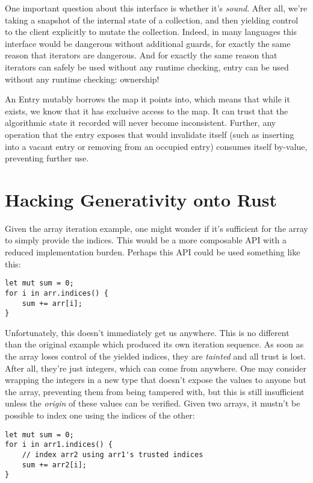 One important question about this interface is whether it's \emph{sound}. After all,
we're taking a snapshot of the internal state of a collection, and then yielding
control to the client explicitly to mutate the collection. Indeed, in many languages
this interface would be dangerous without additional guards, for exactly the same
reason that iterators are dangerous. And for exactly the same reason that iterators
can safely be used without any runtime checking, entry can be used without any
runtime checking: ownership!

An Entry mutably borrows the map it points into, which means that while it
exists, we know that it has exclusive access to the map. It can trust that the
algorithmic state it recorded will never become inconsistent. Further, any operation
that the entry exposes that would invalidate itself (such as inserting into
a vacant entry or removing from an occupied entry) consumes itself by-value,
preventing further use.





\section{Hacking Generativity onto Rust}

Given the array iteration example, one might wonder if it's sufficient for the
array to simply provide the indices. This would be a more composable API with
a reduced implementation burden. Perhaps this API could be used something like this:

\begin{verbatim}
let mut sum = 0;
for i in arr.indices() {
    sum += arr[i];
}
\end{verbatim}

Unfortunately, this doesn't immediately get us anywhere. This is no different
than the original example which produced its own iteration sequence. As soon
as the array loses control of the yielded indices, they are \emph{tainted} and all
trust is lost. After all, they're just integers, which can come from anywhere.
One may consider wrapping the integers in a new type that doesn't
expose the values to anyone but the array, preventing them from being
tampered with, but this is still insufficient unless the \emph{origin} of
these values can be verified. Given two arrays, it mustn't be possible to index
one using the indices of the other:

\begin{verbatim}
let mut sum = 0;
for i in arr1.indices() {
    // index arr2 using arr1's trusted indices
    sum += arr2[i];
}
\end{verbatim}

